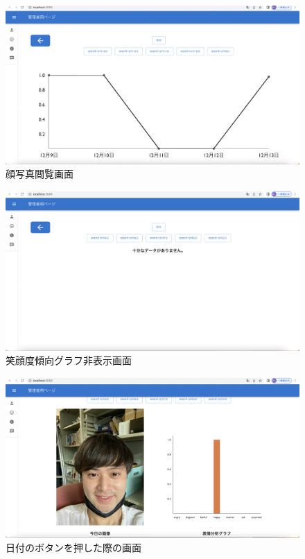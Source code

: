 \begin{figure}[!h]
	\begin{center}
			\includegraphics[scale=0.3, clip]{./img/data.png}
			\caption{顔写真閲覧画面}
			\label{fig:図の名前}
	\end{center}
\end{figure}

\begin{figure}[!h]
	\begin{center}
			\includegraphics[scale=0.3, clip]{./img/sample9.png}
			\caption{笑顔度傾向グラフ非表示画面}
			\label{fig:図の名前}
	\end{center}
\end{figure}

\clearpage

\begin{figure}[!h]
	\begin{center}
			\includegraphics[scale=0.3, clip]{./img/sample10.png}
			\caption{日付のボタンを押した際の画面}
			\label{fig:図の名前}
	\end{center}
\end{figure}

